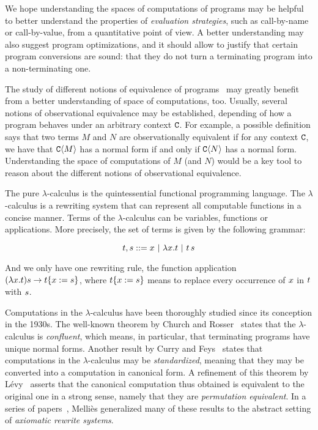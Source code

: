 We hope understanding the spaces of computations of programs
may be helpful to better understand the properties of {\em evaluation strategies},
such as call-by-name or call-by-value,
from a quantitative point of view.
A better understanding may also suggest program optimizations,
and it should allow to justify that certain program conversions are sound:
\eg that they do not turn a terminating program into a non-terminating one.

The study of different notions of equivalence of programs~\cite{Tesis:Morris,Bre16}
may greatly benefit from a better understanding of space of computations, too.
Usually, several notions of observational equivalence may be
established, depending of how a program behaves under an arbitrary context $\mathtt{C}$.
For example, a possible definition says that two terms $M$ and $N$
are observationally equivalent if for any context $\mathtt{C}$, we have that
$\mathtt{C}\langle M\rangle$ has a normal form if and only if $\mathtt{C}\langle N\rangle$ has a normal form.
Understanding the space of computations of $M$ (and $N$) would be a key
tool to reason about the different notions of observational equivalence.

\bigskip

The pure $\lambda$-calculus is the quintessential functional programming language.
The $\lambda$-calculus is a rewriting system that can represent all computable functions in a concise manner.
Terms of the $\lambda$-calculus can be variables, functions or applications.
More precisely, the set of terms is given by the following grammar:

\[
  \tm, \tmtwo ::= \var \ | \ \lam{\var}{\tm} \ | \ \tm\, \tmtwo
\]

And we only have one rewriting rule, the function application
$(\lambda x. t) s \to t\{x := s\}$,
where $t\{x := s\}$ means to replace every occurrence of $x$ in $t$ with $s$.

Computations in the $\lambda$-calculus have been thoroughly
studied since its conception in the 1930s.
The well-known theorem by Church and Rosser~\cite{church1936some}
states that the $\lambda$-calculus is \emph{confluent},
which means, in particular, that terminating programs have unique normal forms.
Another result by Curry and Feys~\cite{curry1958combinatory}
states that computations in the
$\lambda$-calculus may be \emph{standardized},
meaning that they may be converted into a computation in canonical form.
A refinement of this theorem by L\'evy~\cite{Tesis:Levy:1978}
asserts that the canonical computation thus obtained is equivalent to the
original one in a strong sense, namely that they are \emph{permutation equivalent}.
In a series of papers~\cite{DBLP:conf/ctcs/Mellies97,DBLP:journals/logcom/Mellies00,DBLP:conf/rta/Mellies02,mellies2002axiomatic,DBLP:conf/birthday/Mellies05},
Melli\`es generalized many of these results to the abstract setting of {\em axiomatic rewrite systems}.

